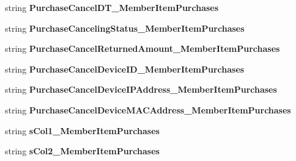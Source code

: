 \begin{DoxyCompactItemize}
\item 
string {\bfseries Purchase\+Cancel\+D\+T\+\_\+\+Member\+Item\+Purchases}\hypertarget{a00004_a5c7ce18e212a4dbf8ae11591262af4c5}{}\label{a00004_a5c7ce18e212a4dbf8ae11591262af4c5}

\item 
string {\bfseries Purchase\+Canceling\+Status\+\_\+\+Member\+Item\+Purchases}\hypertarget{a00004_a32001b51ad30c1d55295cab9921ae0de}{}\label{a00004_a32001b51ad30c1d55295cab9921ae0de}

\item 
string {\bfseries Purchase\+Cancel\+Returned\+Amount\+\_\+\+Member\+Item\+Purchases}\hypertarget{a00004_a493896827850a4f53701a054e90d8288}{}\label{a00004_a493896827850a4f53701a054e90d8288}

\item 
string {\bfseries Purchase\+Cancel\+Device\+I\+D\+\_\+\+Member\+Item\+Purchases}\hypertarget{a00004_a4451f42a1a5355c74749058260a880b2}{}\label{a00004_a4451f42a1a5355c74749058260a880b2}

\item 
string {\bfseries Purchase\+Cancel\+Device\+I\+P\+Address\+\_\+\+Member\+Item\+Purchases}\hypertarget{a00004_acaa33af24e25e15d446db69966a2336b}{}\label{a00004_acaa33af24e25e15d446db69966a2336b}

\item 
string {\bfseries Purchase\+Cancel\+Device\+M\+A\+C\+Address\+\_\+\+Member\+Item\+Purchases}\hypertarget{a00004_aa22dbe5dd0550c5b8cacf6f11c984686}{}\label{a00004_aa22dbe5dd0550c5b8cacf6f11c984686}

\item 
string {\bfseries s\+Col1\+\_\+\+Member\+Item\+Purchases}\hypertarget{a00004_a83394e5ed517468fa578bd4c77e060a5}{}\label{a00004_a83394e5ed517468fa578bd4c77e060a5}

\item 
string {\bfseries s\+Col2\+\_\+\+Member\+Item\+Purchases}\hypertarget{a00004_a898c42d7710bbfebfdd011bd9a158fc2}{}\label{a00004_a898c42d7710bbfebfdd011bd9a158fc2}


\end{DoxyCompactItemize}
